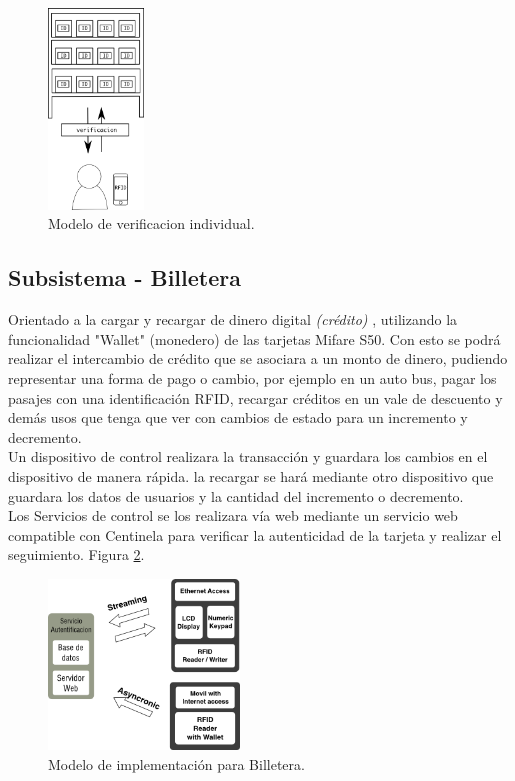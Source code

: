 \documentclass[11pt,twocolumn]{article}
\begin{document}
\begin{figure}[!h]
  \begin{center}
    \includegraphics[width=1in]{store.png}
  \end{center}

  \caption{\small Modelo de verificacion individual.}
  \label{fig-centinela}
\end{figure}


\subsection{Subsistema - Billetera}

Orientado a la cargar y recargar de dinero digital \textit{(cr\'edito)} , utilizando la funcionalidad 
"Wallet" (monedero) de las tarjetas Mifare S50. Con esto se podr\'a realizar 
el intercambio de cr\'edito que se asociara a un monto de dinero, pudiendo 
representar una forma de pago o cambio, por ejemplo en un auto bus, pagar 
los pasajes con una identificaci\'on RFID, recargar cr\'editos en un vale 
de descuento y dem\'as usos que tenga que ver con cambios de estado para un 
incremento y decremento.\\

Un dispositivo de control realizara la transacci\'on y guardara los cambios en 
el dispositivo de manera r\'apida. la recargar se har\'a mediante  otro 
dispositivo que guardara los datos de usuarios y la cantidad del incremento 
o decremento.\\

Los Servicios de control se los realizara v\'ia web mediante un servicio web 
compatible con Centinela para verificar la autenticidad de la tarjeta y 
realizar el seguimiento. Figura \ref{fig-pocketpay}.\\



\begin{figure}[!h]
  \begin{center}
    \includegraphics[width=2in]{pocketpay.png}
  \end{center}

  \caption{\small Modelo de implementaci\'on para Billetera.}
  \label{fig-pocketpay}
\end{figure}
\end{document}

